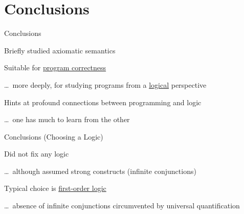 \documentclass{beamer}
\begin{document}
\section{Conclusions}

\begin{frame}{Conclusions}

        Briefly studied axiomatic semantics

        Suitable for \alert{\underline{program correctness}}

        \dots\, more deeply, for studying programs from a \alert{\underline{logical}} 
        perspective

        \bigskip
        \pause
        Hints at profound connections between programming and logic

        \dots \, one has much to learn from the other
\end{frame}

\begin{frame}{Conclusions (Choosing a Logic)}

        Did not fix any logic

        \dots \, although assumed strong constructs (infinite conjunctions)

        Typical choice is \alert{\underline{first-order logic}}

        \dots \, absence of infinite conjunctions circumvented by universal
        quantification
\end{frame}
\end{document}
